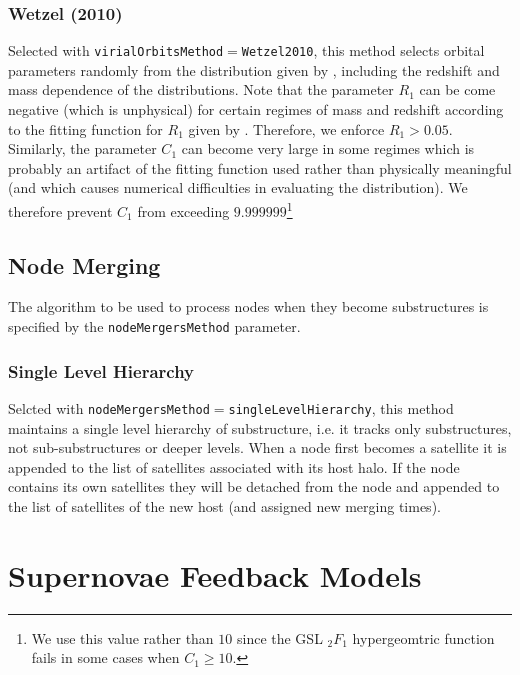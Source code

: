 \subsubsection{Wetzel (2010)}

Selected with {\tt virialOrbitsMethod}$=${\tt Wetzel2010}, this method selects orbital parameters randomly from the distribution given by \cite{wetzel_orbits_2010}, including the redshift and mass dependence of the distributions. Note that the parameter $R_1$ can be come negative (which is unphysical) for certain regimes of mass and redshift according to the fitting function for $R_1$ given by \cite{wetzel_orbits_2010}. Therefore, we enforce $R_1>0.05$. Similarly, the parameter $C_1$ can become very large in some regimes which is probably an artifact of the fitting function used rather than physically meaningful (and which causes numerical difficulties in evaluating the distribution). We therefore prevent $C_1$ from exceeding $9.999999$\footnote{We use this value rather than $10$ since the GSL $_2F_1$ hypergeomtric function fails in some cases when $C_1\ge 10$.}

\subsection{Node Merging}

The algorithm to be used to process nodes when they become substructures is specified by the {\tt nodeMergersMethod} parameter.

\subsubsection{Single Level Hierarchy}

Selcted with {\tt nodeMergersMethod}$=${\tt singleLevelHierarchy}, this method maintains a single level hierarchy of substructure, i.e. it tracks only substructures, not sub-substructures or deeper levels. When a \gls{node} first becomes a satellite it is appended to the list of satellites associated with its host halo. If the \gls{node} contains its own satellites they will be detached from the \gls{node} and appended to the list of satellites of the new host (and assigned new merging times).

\section{Supernovae Feedback Models}\label{sec:sneFeedback}

